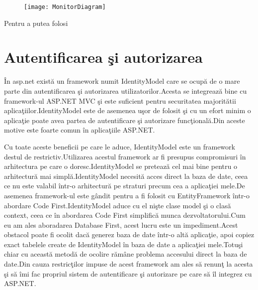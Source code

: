 \documentclass[a4paper,12pt]{report}
\begin{document}
\begin{figure}[!ht]
	\texttt{[image: MonitorDiagram]}
	\label{fig:MonitorDiagram}
\end{figure}
Pentru a putea folosi


\section{Autentificarea \c si autorizarea}

\^In asp.net exist\u a un framework numit IdentityModel care se ocup\u a de o mare parte din autentificarea \c si autorizarea
utilizatorilor.Acesta se integreaz\u a bine cu framework-ul ASP.NET MVC \c si este suficient pentru securitatea majorit\u atii 
aplica\c tiilor.IdentityModel este de asemenea u\c sor de folosit \c si cu un efort minim o aplica\c tie poate avea partea de 
autentificare \c si autorizare func\c tional\u a.Din aceste motive este foarte comun \^in aplica\c tiile ASP.NET.

Cu toate aceste beneficii pe care le aduce, IdentityModel este un framework destul de restrictiv.Utilizarea acestul framework
ar fi presupus compromisuri \^in arhitectura pe care o doresc.IdentityModel se preteaz\u a cel mai bine pentru o arhitectur\u a
mai simpl\u a.IdentityModel necesit\u a acces direct la baza de date, ceea ce nu este valabil \^intr-o arhitectur\u a pe straturi
precum cea a aplica\c tiei mele.De asemenea framework-ul este g\^andit pentru a fi folosit cu EntityFramework \^intr-o abordare 
Code First.IdentityModel aduce cu el ni\c ste clase model \c si o clas\u a context, ceea ce \^in abordarea Code First simplific\u a
munca dezvoltatorului.Cum eu am ales aboradarea Database First, acest lucru este un impediment.Acest obstacol poate fi 
ocolit dac\u a generez baza de date \^intr-o alt\u a aplica\c tie, apoi copiez exact tabelele create de IdentityModel \^in 
baza de date a aplica\c tiei mele.Totu\c si chiar cu aceast\u a metod\u a de ocolire r\u am\^ane problema accesului direct
la baza de date.Din cauza restric\c tilor impuse de acest framework am ales s\u a renun\c t la acesta \c si s\u a \^imi fac 
propriul sistem de autentificare \c si autorizare pe care s\u a \^il integrez cu ASP.NET.
\end{document}
